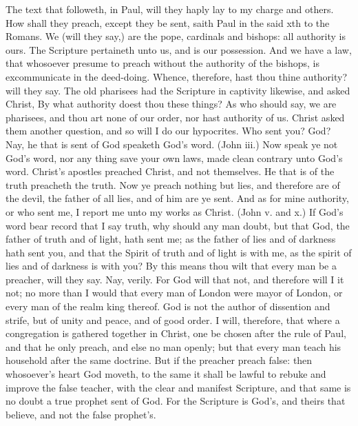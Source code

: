 The text that followeth, in Paul, will they haply lay 
to my charge and others. How shall they preach, except 
they be sent, saith Paul in the said xth to the Romans. We 
(will they say,) are the pope, cardinals and bishops: all 
authority is ours. The Scripture pertaineth unto us, and 
is our possession. And we have a law, that whosoever 
presume to preach without the authority of the bishops, 
is excommunicate in the deed-doing. Whence, therefore,
hast thou thine authority? will they say. The old 
pharisees had the Scripture in captivity likewise, and 
asked Christ, By what authority doest thou these things? 
As who should say, we are pharisees, and thou art none of our 
order, nor hast authority of us. Christ asked them another 
question, and so will I do our hypocrites. Who sent you? 
God? Nay, he that is sent of God speaketh God's 
word. (John iii.) Now speak ye not God's word, nor 
any thing save your own laws, made clean contrary unto 
God's word. Christ's apostles preached Christ, and not 
themselves. He that is of the truth preacheth the truth. 
Now ye preach nothing but lies, and therefore are of 
the devil, the father of all lies, and of him are ye sent. 
And as for mine authority, or who sent me, I report me 
unto my works as Christ. (John v. and x.) If God's 
word bear record that I say truth, why should any man 
doubt, but that God, the father of truth and of light, hath 
sent me; as the father of lies and of darkness hath sent 
you, and that the Spirit of truth and of light is with me, 
as the spirit of lies and of darkness is with you? By this 
means thou wilt that every man be a preacher, will they say. 
Nay, verily. For God will that not, and therefore will 
I it not; no more than I would that every man of London 
were mayor of London, or every man of the realm king 
thereof. God is not the author of dissention and strife, 
but of unity and peace, and of good order. I will, therefore,
that where a congregation is gathered together in 
Christ, one be chosen after the rule of Paul, and that he 
only preach, and else no man openly; but that every man 
teach his household after the same doctrine. But if the 
preacher preach false: then whosoever's heart God moveth, 
to the same it shall be lawful to rebuke and improve the 
false teacher, with the clear and manifest Scripture, and 
that same is no doubt a true prophet sent of God. For 
the Scripture is God's, and theirs that believe, and not 
the false prophet's. 

